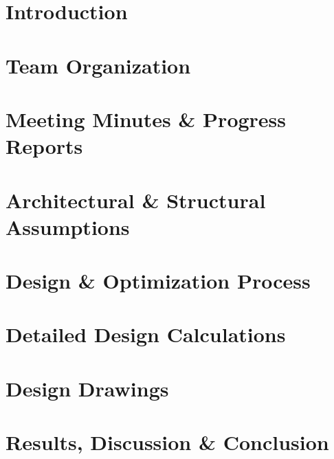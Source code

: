 \documentclass[12pt,twoside,a4paper,openany]{report}
\begin{document}



\section{Introduction}

\clearpage
\section{Team Organization}
\clearpage
\section{Meeting Minutes \& Progress Reports}
\clearpage
\section{Architectural \& Structural Assumptions}

\clearpage
\section{Design \& Optimization Process}
\clearpage
\section{Detailed Design Calculations}

\clearpage
\section{Design Drawings}

\clearpage
\section{Results, Discussion \& Conclusion}

\end{document}
